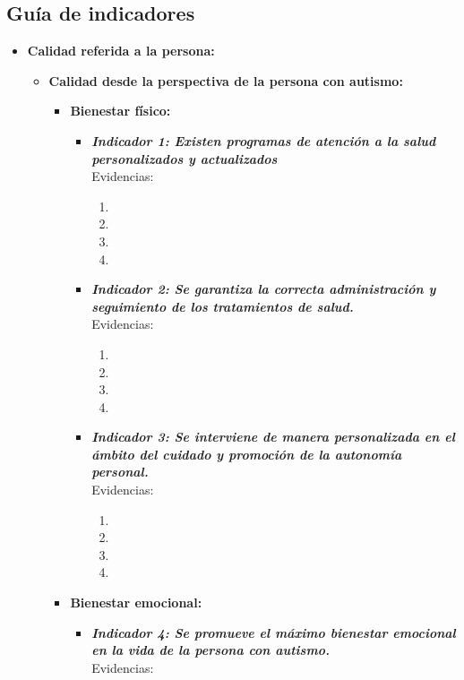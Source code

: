 \subsection{Guía de indicadores}
\begin{itemize}
	\item \textbf{Calidad referida a la persona:}
	\begin{itemize}
		\item \textbf{Calidad desde la perspectiva de la persona con autismo:}
		\begin{itemize}
			\item \textbf{Bienestar físico:}
			\begin{itemize}
				\item \textbf{\textit{Indicador 1: Existen programas de atención a la salud personalizados y actualizados}}\\Evidencias:
				\begin{enumerate}
					\item 
					\item 
					\item 
					\item 
				\end{enumerate}
				\item \textbf{\textit{Indicador 2: Se garantiza la correcta administración y seguimiento de los tratamientos de salud.}}\\Evidencias:
				\begin{enumerate}
					\item 
					\item 
					\item 
					\item 
				\end{enumerate}
				\item \textbf{\textit{Indicador 3: Se interviene de manera personalizada en el ámbito del cuidado y promoción de la autonomía personal.}}\\Evidencias:
				\begin{enumerate}
					\item 
					\item 
					\item 
					\item 
				\end{enumerate}
			\end{itemize}
			\item \textbf{Bienestar emocional:}
			\begin{itemize}
				\item \textbf{\textit{Indicador 4: Se promueve el máximo bienestar emocional en la vida de la persona con autismo.}}\\Evidencias:

\end{itemize}
\end{itemize}
\end{itemize}
\end{itemize}
